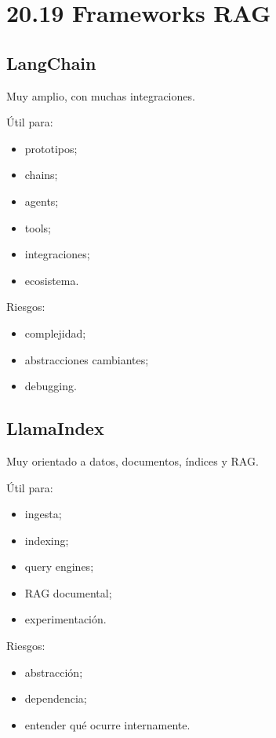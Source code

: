 \section{20.19 Frameworks RAG}\label{frameworks-rag}

\subsection{LangChain}\label{langchain}

Muy amplio, con muchas integraciones.

Útil para:

\begin{itemize}
\tightlist
\item
  prototipos;
\item
  chains;
\item
  agents;
\item
  tools;
\item
  integraciones;
\item
  ecosistema.
\end{itemize}

Riesgos:

\begin{itemize}
\tightlist
\item
  complejidad;
\item
  abstracciones cambiantes;
\item
  debugging.
\end{itemize}

\subsection{LlamaIndex}\label{llamaindex}

Muy orientado a datos, documentos, índices y RAG.

Útil para:

\begin{itemize}
\tightlist
\item
  ingesta;
\item
  indexing;
\item
  query engines;
\item
  RAG documental;
\item
  experimentación.
\end{itemize}

Riesgos:

\begin{itemize}
\tightlist
\item
  abstracción;
\item
  dependencia;
\item
  entender qué ocurre internamente.
\end{itemize}

